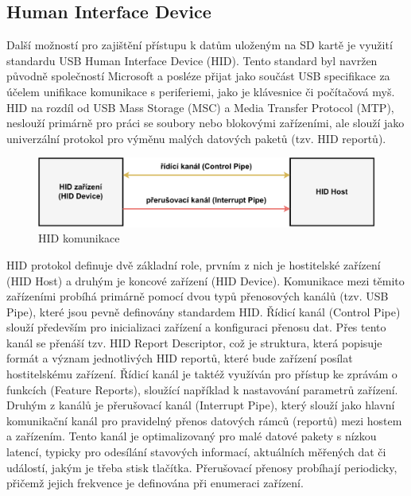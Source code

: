 \subsection{Human Interface Device}
Další možností pro zajištění přístupu k datům uloženým na SD kartě je využití standardu USB Human Interface Device (HID). Tento standard byl navržen původně společností Microsoft a posléze přijat jako součást USB specifikace za účelem unifikace komunikace s periferiemi, jako je klávesnice či počítačová myš. HID na rozdíl od USB Mass Storage (MSC) a Media Transfer Protocol (MTP), neslouží primárně pro práci se soubory nebo blokovými zařízeními, ale slouží jako univerzální protokol pro výměnu malých datových paketů (tzv. HID reportů). \cite{usb_standard_hid, silicon_labs_human_interface_device}

\begin{figure}[h]
    \centering
    \includegraphics[width=1.00\textwidth]{obrazky-figures/hid_communication-cz.pdf}
    
    \caption{HID komunikace \cite{usb_standard_hid}}
    \label{fig:hid-communication}
\end{figure}

HID protokol definuje dvě základní role, prvním z nich je hostitelské zařízení (HID Host) a druhým je koncové zařízení (HID Device). Komunikace mezi těmito zařízeními probíhá primárně pomocí dvou typů přenosových kanálů (tzv. USB Pipe), které jsou pevně definovány standardem HID. Řídicí kanál (Control Pipe) slouží především pro inicializaci zařízení a konfiguraci přenosu dat. Přes tento kanál se přenáší tzv. HID Report Descriptor, což je struktura, která popisuje formát a význam jednotlivých HID reportů, které bude zařízení posílat hostitelskému zařízení. Řídicí kanál je taktéž využíván pro přístup ke zprávám o funkcích (Feature Reports), sloužící například k nastavování parametrů zařízení. Druhým z kanálů je přerušovací kanál (Interrupt Pipe), který slouží jako hlavní komunikační kanál pro pravidelný přenos datových rámců (reportů) mezi hostem a zařízením. Tento kanál je optimalizovaný pro malé datové pakety s nízkou latencí, typicky pro odesílání stavových informací, aktuálních měřených dat či událostí, jakým je třeba stisk tlačítka. Přerušovací přenosy probíhají periodicky, přičemž jejich frekvence je definována při enumeraci zařízení. \cite{usb_standard_hid, silicon_labs_human_interface_device}

